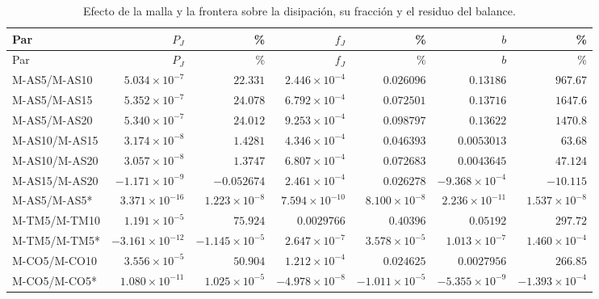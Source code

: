 \begingroup\footnotesize\setlength{\tabcolsep}{1.5pt}
\begin{longtable}{lrrrrrr}
\caption{Efecto de la malla y la frontera sobre la disipación, su fracción y el residuo del balance.}\label{t:sens1}\\
\hline Par & $P_J$ & \% & $f_J$ & \% & $b$ & \% \\ \hline\endfirsthead
\hline Par & $P_J$ & \% & $f_J$ & \% & $b$ & \% \\ \hline\endhead
M-AS5/M-AS10 & $5.034\times 10^{-7}$ & $22.331$ & $2.446\times 10^{-4}$ & $0.026096$ & $0.13186$ & $967.67$ \\
M-AS5/M-AS15 & $5.352\times 10^{-7}$ & $24.078$ & $6.792\times 10^{-4}$ & $0.072501$ & $0.13716$ & $1647.6$ \\
M-AS5/M-AS20 & $5.340\times 10^{-7}$ & $24.012$ & $9.253\times 10^{-4}$ & $0.098797$ & $0.13622$ & $1470.8$ \\
M-AS10/M-AS15 & $3.174\times 10^{-8}$ & $1.4281$ & $4.346\times 10^{-4}$ & $0.046393$ & $0.0053013$ & $63.68$ \\
M-AS10/M-AS20 & $3.057\times 10^{-8}$ & $1.3747$ & $6.807\times 10^{-4}$ & $0.072683$ & $0.0043645$ & $47.124$ \\
M-AS15/M-AS20 & $-1.171\times 10^{-9}$ & $-0.052674$ & $2.461\times 10^{-4}$ & $0.026278$ & $-9.368\times 10^{-4}$ & $-10.115$ \\
M-AS5/M-AS5* & $3.371\times 10^{-16}$ & $1.223\times 10^{-8}$ & $7.594\times 10^{-10}$ & $8.100\times 10^{-8}$ & $2.236\times 10^{-11}$ & $1.537\times 10^{-8}$ \\
M-TM5/M-TM10 & $1.191\times 10^{-5}$ & $75.924$ & $0.0029766$ & $0.40396$ & $0.05192$ & $297.72$ \\
M-TM5/M-TM5* & $-3.161\times 10^{-12}$ & $-1.145\times 10^{-5}$ & $2.647\times 10^{-7}$ & $3.578\times 10^{-5}$ & $1.013\times 10^{-7}$ & $1.460\times 10^{-4}$ \\
M-CO5/M-CO10 & $3.556\times 10^{-5}$ & $50.904$ & $1.212\times 10^{-4}$ & $0.024625$ & $0.0027956$ & $266.85$ \\
M-CO5/M-CO5* & $1.080\times 10^{-11}$ & $1.025\times 10^{-5}$ & $-4.978\times 10^{-8}$ & $-1.011\times 10^{-5}$ & $-5.355\times 10^{-9}$ & $-1.393\times 10^{-4}$ \\
\hline\end{longtable}\endgroup
\begingroup\small\setlength{\tabcolsep}{4pt}
